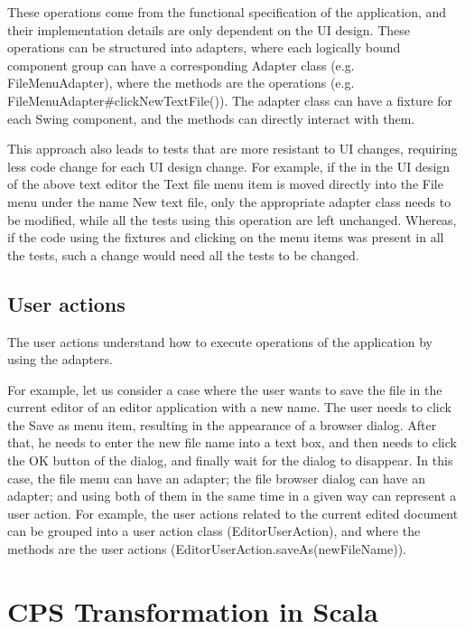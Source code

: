 These operations come from the functional specification of the application, and their implementation details are only dependent on the UI design. These operations can be structured into adapters, where each logically bound component group can have a corresponding Adapter class (e.g. FileMenuAdapter), where the methods are the operations (e.g. FileMenuAdapter\#clickNewTextFile()). The adapter class can have a fixture for each Swing component, and the methods can directly interact with them.

This approach also leads to tests that are more resistant to UI changes, requiring less code change for each UI design change. For example, if the in the UI design of the above text editor the Text file menu item is moved directly into the File menu under the name New text file, only the appropriate adapter class needs to be modified, while all the tests using this operation are left unchanged. Whereas, if the code using the fixtures and clicking on the menu items was present in all the tests, such a change would need all the tests to be changed.

\subsection {User actions}

The user actions understand how to execute operations of the application by using the adapters. 

For example, let us consider a case where the user wants to save the file in the current editor of an editor application with a new name. The user needs to click the Save as menu item, resulting in the appearance of a browser dialog. After that, he needs to enter the new file name into a text box, and then needs to click the OK button of the dialog, and finally wait for the dialog to disappear. In this case, the file menu can have an adapter; the file browser dialog can have an adapter; and using both of them in the same time in a given way can represent a user action. For example, the user actions related to the current edited document can be grouped into a user action class (EditorUserAction), and where the methods are the user actions (EditorUserAction.saveAs(newFileName)).

\section{CPS Transformation in Scala}



